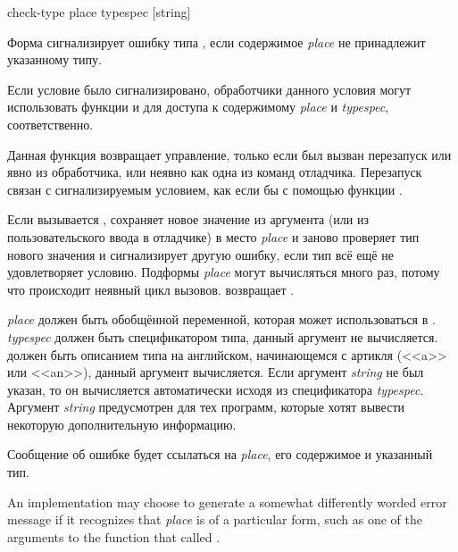 \begin{defmac}
check-type place typespec [string]

Форма  сигнализирует ошибку типа , если
содержимое \emph{place} не принадлежит указанному типу.

Если условие было сигнализировано, обработчики данного условия могут
использовать функции  и 
для доступа к содержимому \emph{place} и \emph{typespec}, соответственно.

Данная функция возвращает управление, только если был вызван перезапуск
 или явно из обработчика, или неявно как одна из команд
отладчика. Перезапуск связан с сигнализируемым условием, как если бы с помощью
функции .

Если вызывается ,  сохраняет новое значение из
аргумента  (или из пользовательского ввода в отладчике) в место
\emph{place} и заново проверяет тип нового значения и сигнализирует другую
ошибку, если тип всё ещё не удовлетворяет условию. Подформы \emph{place} могут
вычисляться много раз, потому что происходит неявный цикл
вызовов.  возвращает .

\emph{place} должен быть обобщённой переменной, которая может использоваться в
. \emph{typespec} должен быть спецификатором типа, данный аргумент не
вычисляется.   должен быть описанием типа на английском,
начинающемся с артикля (<<a>> или <<an>>), данный аргумент вычисляется.  Если
аргумент \emph{string} не был указан, то он вычисляется автоматически исходя из
спецификатора \emph{typespec}. Аргумент \emph{string} предусмотрен для тех
программ, которые хотят вывести некоторую дополнительную информацию.

Сообщение об ошибке будет ссылаться на \emph{place}, его содержимое и указанный тип.

\beforenoterule
\begin{implementation}
  An implementation may choose to generate a somewhat differently worded error
  message if it recognizes that \emph{place} is of a particular form, such as
  one of the arguments to the function that called .
\end{implementation}
\afternoterule


\end{defmac}
